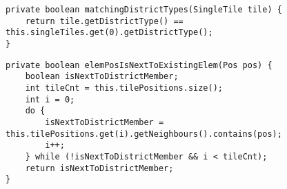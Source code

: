 \begin{lstlisting}[style=CodeHighlighting,float,caption=District - matchingDistrictTypes,label=lst:district_matchingDistrictTypes]
private boolean matchingDistrictTypes(SingleTile tile) {
    return tile.getDistrictType() == this.singleTiles.get(0).getDistrictType();
}
\end{lstlisting}
\begin{lstlisting}[style=CodeHighlighting,float,caption=District - elemPosIsNextToExistingElem,label=lst:district_elemPosIsNextToExistingElem]
private boolean elemPosIsNextToExistingElem(Pos pos) {
    boolean isNextToDistrictMember;
    int tileCnt = this.tilePositions.size();
    int i = 0;
    do {
        isNextToDistrictMember = this.tilePositions.get(i).getNeighbours().contains(pos);
        i++;
    } while (!isNextToDistrictMember && i < tileCnt);
    return isNextToDistrictMember;
}
\end{lstlisting}